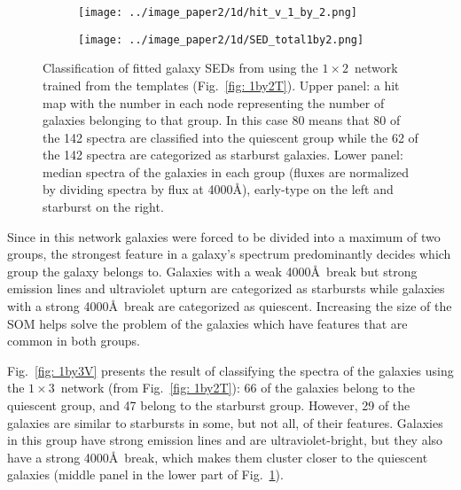             \begin{figure}
                \begin{subfigure}[b]{\textwidth}
                    \centering
                    \texttt{[image: ../image\_paper2/1d/hit\_v\_1\_by\_2.png]}
                \end{subfigure}
                \hfill
                \begin{subfigure}[b]{\textwidth}
                     \texttt{[image: ../image\_paper2/1d/SED\_total1by2.png]}
                \end{subfigure}
                \caption[Classification of fitted galaxy SEDs from \citet{Hossein12} using the $1\times2$~networks]{Classification of fitted galaxy SEDs from \citet{Hossein12} using the $1\times2$~network trained from the \citet{Kinney96} templates (Fig.~\ref{fig: 1by2T}). Upper panel: a hit map with the number in each node representing the number of galaxies belonging to that group. In this case 80 means that 80 of the 142 spectra are classified into the quiescent group while the 62 of the 142 spectra are categorized as starburst galaxies. Lower panel: median spectra of the galaxies in each group (fluxes are normalized by dividing spectra by flux at 4000\AA), early-type on the left and starburst on the right.}
                \label{fig: 1by2V}
            \end{figure}          
            
            Since in this network galaxies were forced to be divided into a maximum of two groups, the strongest feature in a galaxy's spectrum predominantly decides which group the galaxy belongs to.
            Galaxies with a weak 4000\AA~break but strong emission lines and ultraviolet upturn are categorized as starbursts while galaxies with a strong 4000\AA~break are categorized as quiescent.
            Increasing the size of the SOM helps solve the problem of the galaxies which have features that are common in both groups.
            
            Fig.~\ref{fig: 1by3V} presents the result of classifying the spectra of the galaxies using the $1\times3$~network (from Fig.~\ref{fig: 1by2T}): 66 of the galaxies belong to the quiescent group, and 47 belong to the starburst group. 
            However, 29 of the galaxies are similar to starbursts in some, but not all, of their features. 
            Galaxies in this group have strong emission lines and are ultraviolet-bright, but they also have a strong 4000\AA~break, which makes them cluster closer to the quiescent galaxies (middle panel in the lower part of Fig.~\ref{fig: 1by2V}).

